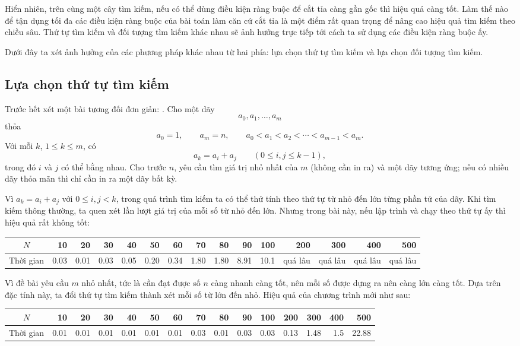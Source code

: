 \documentclass[11pt]{article}
\begin{document}
Hiển nhiên, trên cùng một cây tìm kiếm, nếu có thể dùng điều kiện ràng buộc để
cắt tỉa càng gần gốc thì hiệu quả càng tốt. Làm thế nào để tận dụng tối đa
các điều kiện ràng buộc của bài toán làm căn cứ cắt tỉa là một điểm rất quan
trọng để nâng cao hiệu quả tìm kiếm theo chiều sâu. Thứ tự tìm kiếm và đối
tượng tìm kiếm khác nhau sẽ ảnh hưởng trực tiếp tới cách ta sử dụng các điều
kiện ràng buộc ấy.

Dưới đây ta xét ảnh hưởng của các phương pháp khác nhau từ hai phía: lựa chọn
thứ tự tìm kiếm và lựa chọn đối tượng tìm kiếm.

\subsection{Lựa chọn thứ tự tìm kiếm}

Trước hết xét một bài tương đối đơn giản: . Cho một dãy
\[
  a_0,a_1,\ldots,a_m
\]
thỏa
\[
  a_0=1,\qquad a_m=n,\qquad
  a_0<a_1<a_2<\cdots<a_{m-1}<a_m.
\]
Với mỗi \(k\), \(1\le k\le m\), có
\[
  a_k=a_i+a_j\qquad (0\le i,j\le k-1),
\]
trong đó \(i\) và \(j\) có thể bằng nhau. Cho trước \(n\), yêu cầu tìm giá trị
nhỏ nhất của \(m\) (không cần in ra) và một dãy tương ứng; nếu có nhiều dãy
thỏa mãn thì chỉ cần in ra một dãy bất kỳ.

Vì \(a_k=a_i+a_j\) với \(0\le i,j<k\), trong quá trình tìm kiếm ta có thể thử
tính theo thứ tự từ nhỏ đến lớn từng phần tử của dãy. Khi tìm kiếm thông
thường, ta quen xét lần lượt giá trị của mỗi số từ nhỏ đến lớn. Nhưng trong
bài này, nếu lập trình và chạy theo thứ tự ấy thì hiệu quả rất không tốt:

\begin{center}
\scriptsize
\begin{tabular}{c|rrrrrrrrrrrrrr}
\hline
\(N\) & 10 & 20 & 30 & 40 & 50 & 60 & 70 & 80 & 90 & 100 & 200 & 300 & 400 & 500 \\
\hline
Thời gian & 0.03 & 0.01 & 0.03 & 0.05 & 0.20 & 0.34 & 1.80 & 1.80 & 8.91 & 10.1 &
quá lâu & quá lâu & quá lâu & quá lâu \\
\hline
\end{tabular}
\end{center}

Vì đề bài yêu cầu \(m\) nhỏ nhất, tức là cần đạt được số \(n\) càng nhanh càng
tốt, nên mỗi số được dựng ra nên càng lớn càng tốt. Dựa trên đặc tính này, ta
đổi thứ tự tìm kiếm thành xét mỗi số từ lớn đến nhỏ. Hiệu quả của chương trình
mới như sau:

\begin{center}
\scriptsize
\begin{tabular}{c|rrrrrrrrrrrrrr}
\hline
\(N\) & 10 & 20 & 30 & 40 & 50 & 60 & 70 & 80 & 90 & 100 & 200 & 300 & 400 & 500 \\
\hline
Thời gian & 0.01 & 0.01 & 0.01 & 0.01 & 0.01 & 0.01 & 0.03 & 0.01 & 0.03 & 0.03 &
0.13 & 1.48 & 1.5 & 22.88 \\
\hline
\end{tabular}
\end{center}
\end{document}
